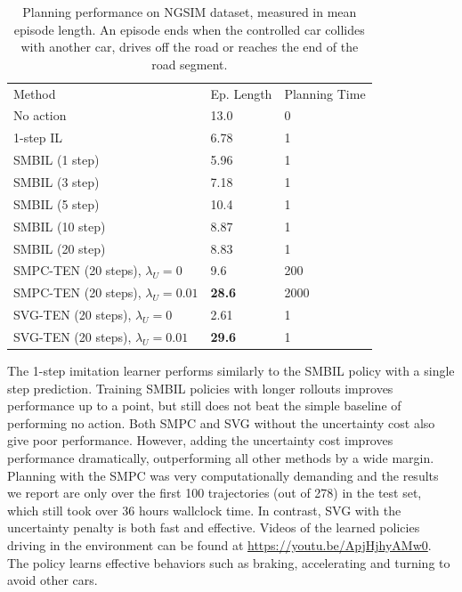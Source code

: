 \documentclass{article} %
\begin{document}
  \begin{table}[t]
    \centering
  \begin{tabular}{|lll|}
    \hline
    Method & Ep. Length & Planning Time \\
    \hhline{|===|}
    No action & 13.0 & 0 \\
    \hline
    1-step IL & 6.78 & 1 \\
    SMBIL (1 step) & 5.96 & 1 \\
    SMBIL (3 step) & 7.18 & 1 \\
    SMBIL (5 step) & 10.4 & 1 \\
    SMBIL (10 step) & 8.87 & 1 \\
    SMBIL (20 step) & 8.83 & 1 \\
    \hline
    SMPC-TEN (20 steps), $\lambda_U=0$ & 9.6 & 200 \\
    SMPC-TEN (20 steps), $\lambda_U=0.01$ & \textbf{28.6} & 2000 \\
    \hline
    SVG-TEN (20 steps), $\lambda_U=0$ & 2.61 & 1 \\
    SVG-TEN (20 steps), $\lambda_U=0.01$ & \textbf{29.6} & 1 \\
    \hline
  \end{tabular}
  \caption{Planning performance on NGSIM dataset, measured in mean episode length. An episode ends when the controlled car collides with another car, drives off the road or reaches the end of the road segment.}
  \label{main-table}
  \end{table}


  The 1-step imitation learner performs similarly to the SMBIL policy with a single step prediction.
  Training SMBIL policies with longer rollouts improves performance up to a point, but still does not beat the simple baseline of performing no action.
  Both SMPC and SVG without the uncertainty cost also give poor performance.
  However, adding the uncertainty cost improves performance dramatically, outperforming all other methods by a wide margin.
  Planning with the SMPC was very computationally demanding and the results we report are only over the first 100 trajectories (out of 278) in the test set, which still took over 36 hours wallclock time.
  In contrast, SVG with the uncertainty penalty is both fast and effective.
  Videos of the learned policies driving in the environment can be found at \url{https://youtu.be/ApjHjhyAMw0}.
  The policy learns effective behaviors such as braking, accelerating and turning to avoid other cars.
\end{document}
